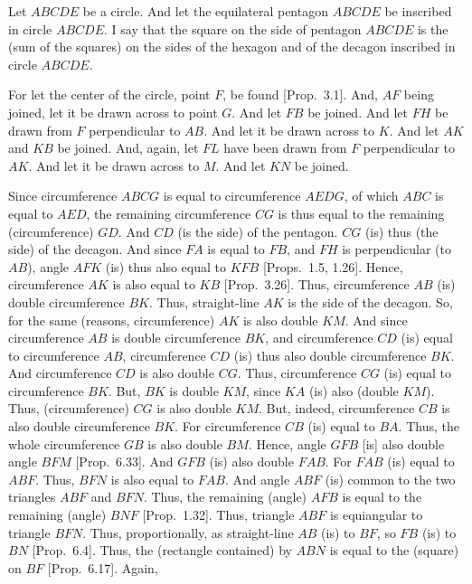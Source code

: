\begin{Parallel}{}{}
{\epsfysize=2.5in
\centerline{}

Let $ABCDE$ be a circle. And let the equilateral pentagon $ABCDE$
be inscribed in circle $ABCDE$. I say that the square on the
side of pentagon $ABCDE$ is the (sum of the squares) on the sides
of the hexagon and of the decagon inscribed in circle $ABCDE$. 

For let the center of the circle, point $F$, be found [Prop.~3.1]. And,
$AF$ being joined, let it be drawn across to point $G$. And
let $FB$ be joined. And let $FH$ be drawn from $F$
perpendicular to $AB$. And let it be drawn across to $K$. 
And let $AK$ and $KB$ be joined.  And, again, let $FL$ have
been drawn from $F$ perpendicular to $AK$. And let it be drawn
across to $M$. And let $KN$ be joined.

Since circumference $ABCG$ is equal to circumference $AEDG$,
of which $ABC$ is equal to $AED$, the remaining circumference
$CG$ is thus equal to the remaining (circumference) $GD$. And $CD$ (is the side) of the pentagon. 
$CG$ (is) thus (the side) of the decagon. And since  $FA$ is equal to $FB$,
and $FH$ is perpendicular (to $AB$), angle $AFK$ (is) thus also equal
to $KFB$ [Props.~1.5, 1.26]. Hence, circumference $AK$
is also equal to $KB$ [Prop.~3.26]. Thus, circumference $AB$ (is)
double circumference $BK$. Thus, straight-line $AK$ is the side of the decagon. 
So, for the same (reasons, circumference)  $AK$ is also double $KM$. And since
circumference $AB$ is double circumference $BK$, and
circumference $CD$ (is) equal to circumference $AB$, circumference
$CD$ (is) thus also double circumference $BK$. And
circumference $CD$ is also double $CG$. Thus, circumference
$CG$ (is) equal to circumference $BK$. But, $BK$
is double $KM$, since $KA$ (is) also (double $KM$). Thus,
(circumference) $CG$ is also double $KM$. But, indeed, circumference $CB$ is also
double circumference $BK$. For circumference $CB$ (is) equal to $BA$. 
Thus, the whole circumference $GB$ is also double $BM$. 
Hence, angle $GFB$ [is] also double  angle $BFM$ [Prop.~6.33].
And $GFB$ (is) also double $FAB$. For $FAB$ (is) equal to $ABF$. 
Thus, $BFN$ is also equal to $FAB$. And angle $ABF$ (is) common
to the two triangles $ABF$ and $BFN$. Thus, the
remaining (angle) $AFB$ is equal to the remaining (angle) $BNF$
[Prop.~1.32]. Thus, triangle $ABF$ is equiangular to triangle
$BFN$. Thus, proportionally, as straight-line $AB$ (is) to
$BF$, so $FB$ (is) to $BN$ [Prop.~6.4]. Thus, the (rectangle contained)
by $ABN$ is equal to the (square) on $BF$ [Prop.~6.17]. Again,
}
\end{Parallel}
